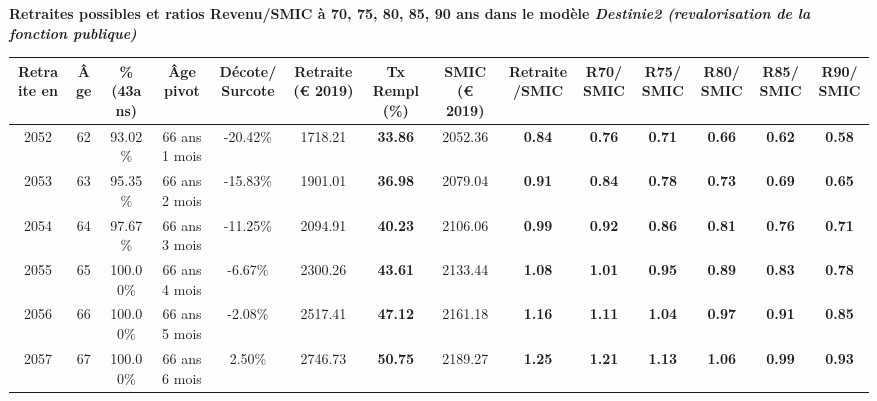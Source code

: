  \vspace{0.1cm} 
{\bf \noindent Retraites possibles et ratios Revenu/SMIC à 70, 75, 80, 85, 90 ans dans le modèle \emph{Destinie2 (revalorisation de la fonction publique)}}  
 
\begin{adjustbox}{max width=\textwidth} 
\begin{tabular}[htb]{|c|c||c|c|c||c|c||c|c||c|c|c|c|c|} 
\hline 
 Retraite en &  Âge &  \%(43ans) &  Âge pivot &  Décote/Surcote &  Retraite (\euro{} 2019) &  Tx Rempl(\%) &  SMIC (\euro{} 2019) &  Retraite/SMIC &  R70/SMIC &  R75/SMIC &  R80/SMIC &  R85/SMIC &  R90/SMIC \\ 
\hline \hline 
 2052 &  62 &  93.02\% &  66 ans 1 mois &  -20.42\% &  1718.21 &  {\bf 33.86} &  2052.36 &  {\bf {\color{red} 0.84}} &  {\bf {\color{red} 0.76}} &  {\bf {\color{red} 0.71}} &  {\bf {\color{red} 0.66}} &  {\bf {\color{red} 0.62}} &  {\bf {\color{red} 0.58}} \\ 
\hline 
 2053 &  63 &  95.35\% &  66 ans 2 mois &  -15.83\% &  1901.01 &  {\bf 36.98} &  2079.04 &  {\bf {\color{red} 0.91}} &  {\bf {\color{red} 0.84}} &  {\bf {\color{red} 0.78}} &  {\bf {\color{red} 0.73}} &  {\bf {\color{red} 0.69}} &  {\bf {\color{red} 0.65}} \\ 
\hline 
 2054 &  64 &  97.67\% &  66 ans 3 mois &  -11.25\% &  2094.91 &  {\bf 40.23} &  2106.06 &  {\bf {\color{red} 0.99}} &  {\bf {\color{red} 0.92}} &  {\bf {\color{red} 0.86}} &  {\bf {\color{red} 0.81}} &  {\bf {\color{red} 0.76}} &  {\bf {\color{red} 0.71}} \\ 
\hline 
 2055 &  65 &  100.00\% &  66 ans 4 mois &  -6.67\% &  2300.26 &  {\bf 43.61} &  2133.44 &  {\bf 1.08} &  {\bf 1.01} &  {\bf {\color{red} 0.95}} &  {\bf {\color{red} 0.89}} &  {\bf {\color{red} 0.83}} &  {\bf {\color{red} 0.78}} \\ 
\hline 
 2056 &  66 &  100.00\% &  66 ans 5 mois &  -2.08\% &  2517.41 &  {\bf 47.12} &  2161.18 &  {\bf 1.16} &  {\bf 1.11} &  {\bf 1.04} &  {\bf {\color{red} 0.97}} &  {\bf {\color{red} 0.91}} &  {\bf {\color{red} 0.85}} \\ 
\hline 
 2057 &  67 &  100.00\% &  66 ans 6 mois &  2.50\% &  2746.73 &  {\bf 50.75} &  2189.27 &  {\bf 1.25} &  {\bf 1.21} &  {\bf 1.13} &  {\bf 1.06} &  {\bf {\color{red} 0.99}} &  {\bf {\color{red} 0.93}} \\ 
\hline 
\hline 
\end{tabular} 
\end{adjustbox} 
 
 \vspace{0.1cm} 

